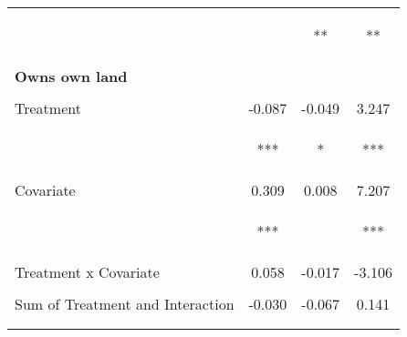 \begin{tabular}{lccc}
 & \begin{footnotesize}[0.031]\end{footnotesize} & \begin{footnotesize}[0.029]**\end{footnotesize} & \begin{footnotesize}[1.057]**\end{footnotesize}\\
\noalign{\smallskip}\textbf{Owns own land} &  &  & \\
 & \begin{footnotesize}\end{footnotesize} & \begin{footnotesize}\end{footnotesize} & \begin{footnotesize}\end{footnotesize}\\
\noalign{\smallskip}Treatment & -0.087 & -0.049 & 3.247\\
 & \begin{footnotesize}[0.031]***\end{footnotesize} & \begin{footnotesize}[0.028]*\end{footnotesize} & \begin{footnotesize}[1.034]***\end{footnotesize}\\
\noalign{\smallskip}Covariate & 0.309 & 0.008 & 7.207\\
 & \begin{footnotesize}[0.053]***\end{footnotesize} & \begin{footnotesize}[0.044]\end{footnotesize} & \begin{footnotesize}[1.710]***\end{footnotesize}\\
\noalign{\smallskip}Treatment x Covariate & 0.058 & -0.017 & -3.106\\
 & \begin{footnotesize}[0.076]\end{footnotesize} & \begin{footnotesize}[0.064]\end{footnotesize} & \begin{footnotesize}[2.513]\end{footnotesize}\\
\noalign{\smallskip}Sum of Treatment and Interaction & -0.030 & -0.067 & 0.141\\
 & \begin{footnotesize}[0.072]\end{footnotesize} & \begin{footnotesize}[0.060]\end{footnotesize} & \begin{footnotesize}[2.327]\end{footnotesize}\\
\noalign{\smallskip}\hline\end{tabular}
